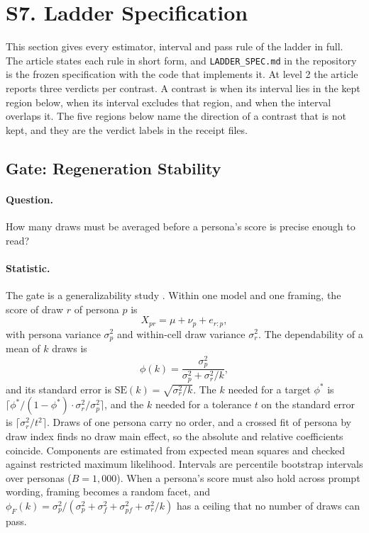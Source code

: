 \section{S7. Ladder Specification}
\label{sec:s7}

This section gives every estimator, interval and pass rule of the ladder in full.
The article states each rule in short form, and \texttt{LADDER\_SPEC.md} in the repository is the frozen specification with the code that implements it.
At level 2 the article reports three verdicts per contrast.
A contrast is  when its interval lies in the kept region below,  when its interval excludes that region, and  when the interval overlaps it.
The five regions below name the direction of a contrast that is not kept, and they are the verdict labels in the receipt files.

\subsection*{Gate: Regeneration Stability}
\label{sec:s7-gate}

\paragraph{Question.}
How many draws must be averaged before a persona's score is precise enough to read?

\paragraph{Statistic.}
The gate is a generalizability study \citep{cronbach1972dependability,brennan2001gtheory}.
Within one model and one framing, the score of draw $r$ of persona $p$ is
\begin{equation}
X_{pr} = \mu + \nu_p + e_{r:p},
\end{equation}
with persona variance $\sigma^2_p$ and within-cell draw variance $\sigma^2_r$.
The dependability of a mean of $k$ draws is
\begin{equation}
\phi(k) = \frac{\sigma^2_p}{\sigma^2_p + \sigma^2_r / k},
\label{eq:phi}
\end{equation}
and its standard error is $\mathrm{SE}(k) = \sqrt{\sigma^2_r / k}$.
The $k$ needed for a target $\phi^*$ is $\lceil \phi^*/(1-\phi^*) \cdot \sigma^2_r/\sigma^2_p \rceil$, and the $k$ needed for a tolerance $t$ on the standard error is $\lceil \sigma^2_r / t^2 \rceil$.
Draws of one persona carry no order, and a crossed fit of persona by draw index finds no draw main effect, so the absolute and relative coefficients coincide. %
Components are estimated from expected mean squares and checked against restricted maximum likelihood. %
Intervals are percentile bootstrap intervals over personas ($B = 1{,}000$).
When a persona's score must also hold across prompt wording, framing becomes a random facet, and $\phi_F(k) = \sigma^2_p / (\sigma^2_p + \sigma^2_f + \sigma^2_{pf} + \sigma^2_r/k)$ has a ceiling that no number of draws can pass.

